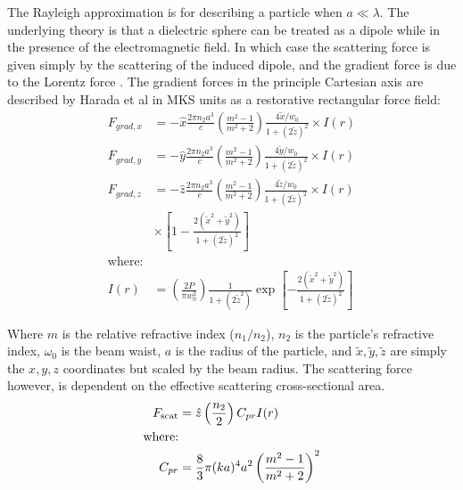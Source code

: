The Rayleigh approximation is for describing a particle when 
$a \ll \lambda$. The underlying theory is that a dielectric sphere 
can be treated as a dipole while in the presence of the 
electromagnetic field. In which case the scattering force is 
given simply by the scattering of the induced dipole, and the 
gradient force is due to the Lorentz force \cite{Gordon1973}. 
The gradient forces in the principle Cartesian axis are 
described by Harada et al \cite{YasuhiroHarada1996} in MKS units 
as a restorative rectangular force field:
\begin{align}
  F_{grad,x}
  &=-\hat{x} \frac{2\pi n_2 a^3}{c}
    \left(\frac{m^2-1}{m^2+2}\right) \frac{4\tilde{x}/w_0}{1+(2\tilde{z})^2} \times I(r)
  \label{eq:Rayleigh_start}\\
  F_{grad,y}
  &=-\hat{y} \frac{2\pi n_2 a^3}{c}
    \left(\frac{m^2-1}{m^2+2}\right) \frac{4\tilde{y}/w_0}{1+(2\tilde{z})^2} \times I(r)
  \\
  F_{grad,z}
  &=-\hat{z} \frac{2\pi n_2 a^3}{c}
    \left(\frac{m^2-1}{m^2+2}\right) \frac{4\tilde{z}/w_0}{1+(2\tilde{z})^2}
    \nonumber \times I(r)
  \\ 
  & \times \left[1-\frac{2(\tilde{x}^2+\tilde{y}^2)}{1+(2\tilde{z})^2} \right]
  \\
  \label{eq:Rayleigh_end}
  \text{where:}
  \nonumber
  \\
	I(r) &= \left(\frac{2P}{\pi w_0^2}\right) \frac{1}{1+(2\tilde{z}^2)} 
	\exp \left[ - \frac{2(\tilde{x}^2+\tilde{y}^2)}{1+(2\tilde{z})^2} \right]
\end{align}

\noindent
Where $m$ is the relative refractive index ($n_1/n_2$), $n_2$ is 
the particle's refractive index, $\omega_0$ is the beam waist, 
$a$ is the radius of the particle, and $\tilde{x}, \tilde{y}, 
\tilde{z}$ are simply the $x, y, z$ coordinates but scaled by the 
beam radius. The scattering force however, is dependent on the 
effective scattering cross-sectional area. 
\begin{align}
  F_{\rm scat}
  &= \hat{z} \left(\frac{n_2}{2}\right) C_{pr} I(r) \\
  \text{where:} \nonumber \\
  C_{pr} &= \frac{8}{3} \pi (ka)^4 a^2 \left(\frac{m^2-1}{m^2+2}\right)^2
\end{align}

